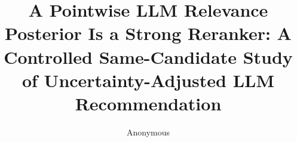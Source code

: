 \documentclass[sigconf,nonacm]{acmart}
\begin{document}
\title{A Pointwise LLM Relevance Posterior Is a Strong Reranker: A Controlled
Same-Candidate Study of Uncertainty-Adjusted LLM Recommendation}

\author{Anonymous}



\maketitle











\end{document}
